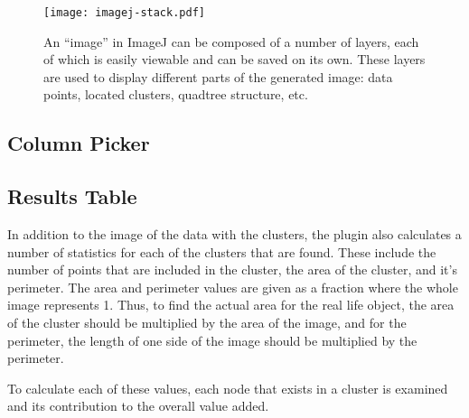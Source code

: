 \begin{figure}[tbhp]
	\centering
	\texttt{[image: imagej-stack.pdf]}
	\caption{An ``image'' in ImageJ can be composed of a number of layers, each
		of which is easily viewable and can be saved on its own. These layers
		are used to display different parts of the generated image: data
		points, located clusters, quadtree structure, etc.}
	\label{fig:imagej-stack}
\end{figure}

\subsection{Column Picker}
\label{sub:column_picker}


\subsection{Results Table}
\label{sub:results_table}

In addition to the image of the data with the clusters, the plugin also
calculates a number of statistics for each of the clusters that are found.
These include the number of points that are included in the cluster, the area
of the cluster, and it's perimeter. The area and perimeter values are given as
a fraction where the whole image represents 1. Thus, to find the actual area
for the real life object, the area of the cluster should be multiplied by the
area of the image, and for the perimeter, the length of one side of the image
should be multiplied by the perimeter.

To calculate each of these values, each node that exists in a cluster is
examined and its contribution to the overall value added.
